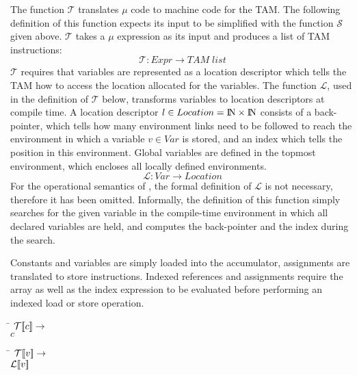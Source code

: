The function $\mathcal{T}$ translates $\mu$\turtle{} code to machine
code for the TAM.  The following definition of this function expects
its input to be simplified with the function $\mathcal{S}$ given
above.  $\mathcal{T}$ takes a $\mu$\turtle{} expression as its input
and produces a list of TAM instructions:
%
$$\mathcal{T}: Expr \rightarrow TAM \; list$$
%
$\mathcal{T}$ requires that variables are represented as a location
descriptor which tells the TAM how to access the location allocated
for the variables.  The function $\mathcal{L}$, used in the definition
of $\mathcal{T}$ below, transforms variables to location descriptors
at compile time.  A location descriptor $l\in
Location=\text{I\!N}\times \text{I\!N}$ consists of a back-pointer,
which tells how many environment links need to be followed to reach
the environment in which a variable $v\in Var$ is stored, and an index
which tells the position in this environment.  Global variables are
defined in the topmost environment, which encloses all locally defined
environments.
%
$$\mathcal{L}: Var \rightarrow Location$$
%
For the operational semantics of \turtle{}, the formal definition of
$\mathcal{L}$ is not necessary, therefore it has been omitted.
Informally, the definition of this function simply searches for the
given variable in the compile-time environment in which all declared
variables are held, and computes the back-pointer and the index during
the search.

Constants and variables are simply loaded into the accumulator,
assignments are translated to store instructions.  Indexed references
and assignments require the array as well as the index expression to
be evaluated before performing an indexed load or store operation.

\begin{tabbing}
\qquad \= \quad \kill
${\mathcal{T}{\normalfont [\![} c {\normalfont ]\!]}} \rightarrow$\\
$c$
\end{tabbing}

\begin{tabbing}
\qquad \= \quad \kill
${\mathcal{T}{\normalfont [\![} v {\normalfont ]\!]}} \rightarrow$\\
$\mathcal{L}{\normalfont [\![}{}v{\normalfont ]\!]}{}$
\end{tabbing}


